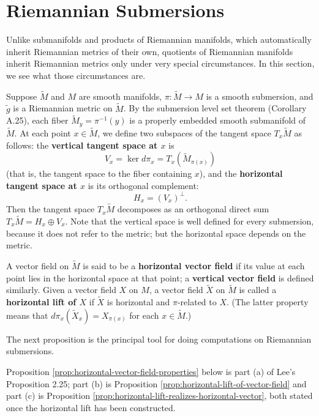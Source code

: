 \section{Riemannian Submersions}

Unlike submanifolds and products of Riemannian manifolds, which automatically inherit Riemannian metrics of their own, quotients of Riemannian manifolds inherit Riemannian metrics only under very special circumstances. In this section, we see what those circumstances are.

Suppose $\tilde{M}$ and $M$ are smooth manifolds, $\pi : \tilde{M} \to M$ is a smooth submersion, and $\tilde{g}$ is a Riemannian metric on $\tilde{M}$. By the submersion level set theorem (Corollary A.25), each fiber $\tilde{M}_y = \pi^{-1}(y)$ is a properly embedded smooth submanifold of $\tilde{M}$. At each point $x \in \tilde{M}$, we define two subspaces of the tangent space $T_x \tilde{M}$ as follows: the \textbf{vertical tangent space at $x$} is
\[
V_x = \ker d\pi_x = T_x(\tilde{M}_{\pi(x)})
\]
(that is, the tangent space to the fiber containing $x$), and the \textbf{horizontal tangent space at $x$} is its orthogonal complement:
\[
H_x = (V_x)^\perp.
\]
Then the tangent space $T_x \tilde{M}$ decomposes as an orthogonal direct sum $T_x \tilde{M} = H_x \oplus V_x$. Note that the vertical space is well defined for every submersion, because it does not refer to the metric; but the horizontal space depends on the metric.

A vector field on $\tilde{M}$ is said to be a \textbf{horizontal vector field} if its value at each point lies in the horizontal space at that point; a \textbf{vertical vector field} is defined similarly. Given a vector field $X$ on $M$, a vector field $\tilde{X}$ on $\tilde{M}$ is called a \textbf{horizontal lift of $X$} if $\tilde{X}$ is horizontal and $\pi$-related to $X$. (The latter property means that $d\pi_x(\tilde{X}_x) = X_{\pi(x)}$ for each $x \in \tilde{M}$.)

The next proposition is the principal tool for doing computations on Riemannian submersions.

Proposition \ref{prop:horizontal-vector-field-properties} below is part (a) of
Lee's Proposition 2.25; part (b) is Proposition
\ref{prop:horizontal-lift-of-vector-field} and part (c) is Proposition
\ref{prop:horizontal-lift-realizes-horizontal-vector}, both stated once the
horizontal lift has been constructed.

